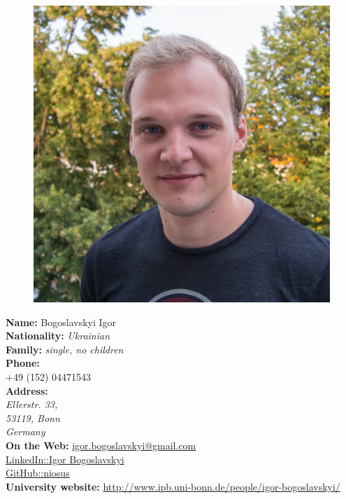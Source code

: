 \documentclass[a4paper,12pt,final]{memoir}
\newcommand{\SmallSep}{\vspace{0.5em}}
\begin{document}
\begin{figure}
	\hfill
	\includegraphics[width=\columnwidth]{igor.jpg}
	\vspace{-5cm}
\end{figure}

\begin{flushleft}\small
	\textbf{Name:} Bogoslavskyi Igor\\
	\SmallSep
	\textbf{Nationality:} \emph{Ukrainian}\\
	\SmallSep
	\textbf{Family:} \emph{single, no children}\\
	\SmallSep
	\textbf{Phone:} \\ +49 (152) 04471543\\
	\SmallSep
	\textbf{Address:}\\ \emph{Ellerstr. 33, \\53119, Bonn \\Germany}\\
	\SmallSep
	\textbf{On the Web:}
	\SmallSep
	\href{mailto:igor.bogoslavskyi@gmail.com}{igor.bogoslavskyi@gmail.com}\\
	\SmallSep
	\href{https://de.linkedin.com/in/igor-bogoslavskyi-72650b43}{LinkedIn::Igor Bogoslavskyi}\\
	\SmallSep
	\href{https://github.com/niosus}{GitHub::niosus}\\
	\SmallSep
	\textbf{University website:}
	\SmallSep
	\href{http://www.ipb.uni-bonn.de/people/igor-bogoslavskyi/}{http://www.ipb.uni-bonn.de/people/igor-bogoslavskyi/}\\
\end{flushleft}
\normalsize
\end{document}
